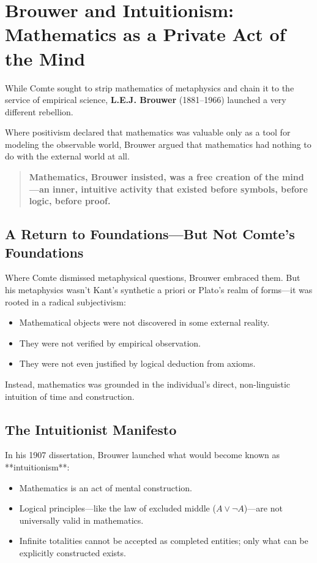 \section{Brouwer and Intuitionism: Mathematics as a Private Act of the Mind}

While Comte sought to strip mathematics of metaphysics and chain it to the service of empirical science, \textbf{L.E.J. Brouwer} (1881–1966) launched a very different rebellion.

Where positivism declared that mathematics was valuable only as a tool for modeling the observable world, Brouwer argued that mathematics had nothing to do with the external world at all.

\begin{quote}
\textbf{Mathematics, Brouwer insisted, was a free creation of the mind—an inner, intuitive activity that existed before symbols, before logic, before proof.}
\end{quote}

\subsection*{A Return to Foundations—But Not Comte’s Foundations}

Where Comte dismissed metaphysical questions, Brouwer embraced them. But his metaphysics wasn’t Kant’s synthetic a priori or Plato’s realm of forms—it was rooted in a radical subjectivism:

\begin{itemize}
    \item Mathematical objects were not discovered in some external reality.
    \item They were not verified by empirical observation.
    \item They were not even justified by logical deduction from axioms.
\end{itemize}

Instead, mathematics was grounded in the individual’s direct, non-linguistic intuition of time and construction.

\subsection*{The Intuitionist Manifesto}

In his 1907 dissertation, Brouwer launched what would become known as **intuitionism**:

\begin{itemize}
    \item Mathematics is an act of mental construction.
    \item Logical principles—like the law of excluded middle (\( A \vee \neg A \))—are not universally valid in mathematics.
    \item Infinite totalities cannot be accepted as completed entities; only what can be explicitly constructed exists.
\end{itemize}

